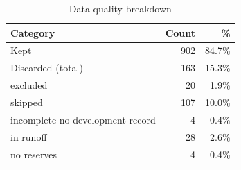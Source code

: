 \begin{table}[htbp]
\centering
\caption{Data quality breakdown}
\label{tab:data_quality}
\begin{tabular}{lrr}
\toprule
\textbf{Category} & \textbf{Count} & \textbf{\%} \\
\midrule
Kept & 902 & 84.7\% \\
Discarded (total) & 163 & 15.3\% \\
\quad excluded & 20 & 1.9\% \\
\quad skipped & 107 & 10.0\% \\
\quad incomplete no development record & 4 & 0.4\% \\
\quad in runoff & 28 & 2.6\% \\
\quad no reserves & 4 & 0.4\% \\
\bottomrule
\end{tabular}
\end{table}
